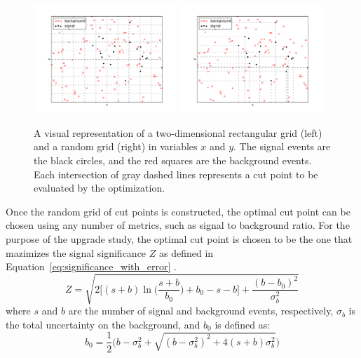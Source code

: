 \begin{figure}[htp]
  \centering
  \includegraphics[width=0.48\textwidth]{figs/ssww_upgrade/rgs/square_grid}
  \includegraphics[width=0.48\textwidth]{figs/ssww_upgrade/rgs/random_grid}
  \caption{A visual representation of a two-dimensional rectangular grid (left) and a random grid (right) in variables $x$ and $y$.  The signal events are the black circles, and the red squares are the background events.  Each intersection of gray dashed lines represents a cut point to be evaluated by the optimization.}
  \label{fig:rgs_grids}
\end{figure}


Once the random grid of cut points is constructed, the optimal cut point can be chosen using any number of metrics, such as signal to background ratio.
For the purpose of the \ssww upgrade study, the optimal cut point is chosen to be the one that mazimizes the signal significance $Z$ as defined in Equation~\ref{eq:significance_with_error} \cite{2011.asimov-significance}.
\begin{equation}
Z = \sqrt{2{\bigg[}(s+b)\ln{\Big(}\frac{s+b}{b_0}{\Big)}+b_0-s-b{\bigg]}+\frac{(b-b_0)^2}{\sigma_b^2}}
\label{eq:significance_with_error}
\end{equation}
where $s$ and $b$ are the number of signal and background events, respectively, $\sigma_b$ is the total uncertainty on the background, and $b_0$ is defined as:
\begin{equation}
b_0 = \frac{1}{2}{\Big(}b-\sigma_b^2+\sqrt{(b-\sigma_b^2)^2+4(s+b)\sigma_b^2}{\Big)}
\label{eq:significance_b0}
\end{equation}

